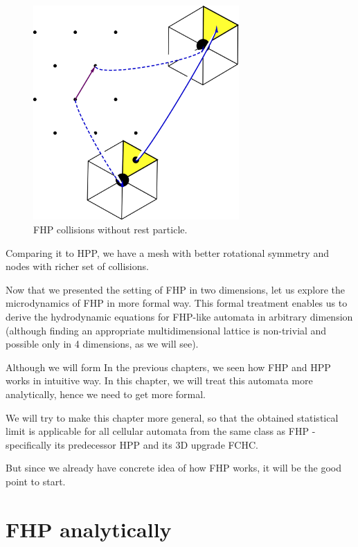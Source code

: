\begin{figure}[H]
 \centering
 \includegraphics[width=0.7\textwidth]{./img/FHPprop}
 \caption{FHP collisions without rest particle.}
 \label{FHPprop}
\end{figure}

Comparing it to HPP, we have a mesh with better rotational symmetry and nodes with richer  set of collisions.

Now that we presented the setting of FHP in two dimensions, let us explore the microdynamics of FHP in more formal way. This formal treatment enables us to derive the hydrodynamic equations for FHP-like automata in arbitrary dimension (although finding an appropriate multidimensional lattice is non-trivial and possible only in 4 dimensions, as we will see).


Although we will form 
In the previous chapters, we seen how FHP and HPP works in intuitive way. 
In this chapter, we will treat this automata more analytically, hence we need to get more formal.

We will try to make this chapter more general, so that the obtained statistical limit is applicable for all cellular automata from the same class as FHP - specifically its predecessor HPP and its 3D upgrade FCHC.

\bigskip

But since we already have concrete idea of how FHP works, it will be the good point to start.

\section{FHP analytically}


